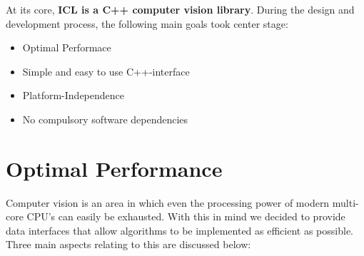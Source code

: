 At its core,  \textbf{ICL is a C++ computer vision library}. During the design and development process, the following main goals took center stage: 
\begin{itemize}
\item Optimal Performace
\item Simple and easy to use C++-interface
\item Platform-Independence 
\item No compulsory software dependencies
\end{itemize}


\section{Optimal Performance\label{sec:optimal-performace}} 
Computer vision is an area in which even the processing power of modern multi-core CPU's can easily be exhausted. With this in mind we decided to provide data interfaces that allow algorithms to be implemented as efficient as possible. Three main aspects relating to this are discussed below:
